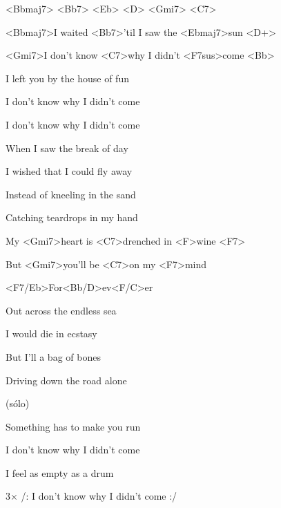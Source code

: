 
<Bbmaj7> <Bb7> <Eb> <D> <Gmi7> <C7>

\zs
<Bbmaj7>I waited <Bb7>'til I saw the <Ebmaj7>sun <D+>

<Gmi7>I don't know <C7>why I didn't <F7sus>come <Bb>

I left you by the house of fun

I don't know why I didn't come

I don't know why I didn't come
\ks

\zs
When I saw the break of day

I wished that I could fly away

Instead of kneeling in the sand

Catching teardrops in my hand
\ks

\zr
My <Gmi7>heart is <C7>drenched in <F>wine <F7>

But <Gmi7>you'll be <C7>on my <F7>mind
 
<F7/Eb>For<Bb/D>ev<F/C>er
\kr

\zs
Out across the endless sea

I would die in ecstasy

But I'll a bag of bones

Driving down the road alone
\ks

\zr
\kr

\zs
(sólo)
\ks

\zs
Something has to make you run

I don't know why I didn't come

I feel as empty as a drum

3× /: I don't know why I didn't come :/
\ks

\kp
